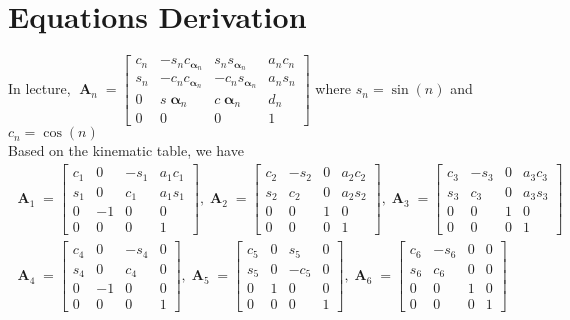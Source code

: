 \documentclass[12pt]{article}
\DeclareMathOperator{\A}{\mathbf{A}}
\DeclareMathOperator{\al}{\mathbf{\alpha}}
\begin{document}
\section{Equations Derivation}
  In lecture, $\A_n =
  \begin{bmatrix}
  c_n & -s_nc_{\al_n} &  s_ns_{\al_n} & a_nc_n\\
  s_n & -c_nc_{\al_n} & -c_ns_{\al_n} & a_ns_n\\
  0 & s\al_n & c\al_n & d_n\\
  0 & 0 & 0 & 1
  \end{bmatrix}$ where $s_n = \sin(n)$ and $c_n = \cos(n)$\\
  Based on the kinematic table, we have
  \begin{align*}
    \A_1 =
    \begin{bmatrix}
      c_1 & 0 & -s_1 & a_1c_1\\
      s_1 & 0 & c_1 & a_1s_1\\
      0 & -1 & 0 & 0\\
      0 & 0 & 0 & 1
    \end{bmatrix},
    \A_2 =
    \begin{bmatrix}
      c_2 & -s_2 & 0 & a_2c_2\\
      s_2 & c_2 & 0 & a_2s_2\\
      0 & 0 & 1 & 0\\
      0 & 0 & 0 & 1
    \end{bmatrix},
    \A_3 =
    \begin{bmatrix}
      c_3 & -s_3 & 0 & a_3c_3\\
      s_3 & c_3 & 0 & a_3s_3\\
      0 & 0 & 1 & 0\\
      0 & 0 & 0 & 1
    \end{bmatrix}
  \end{align*}
  \begin{align*}
    \A_4 =
    \begin{bmatrix}
      c_4 & 0 & -s_4 & 0\\
      s_4 & 0 & c_4 & 0\\
      0 & -1 & 0 & 0\\
      0 & 0 & 0 & 1
    \end{bmatrix},
    \A_5 =
    \begin{bmatrix}
      c_5 & 0 & s_5 & 0\\
      s_5 & 0 & -c_5 & 0\\
      0 & 1 & 0 & 0\\
      0 & 0 & 0 & 1
    \end{bmatrix},
    \A_6 =
    \begin{bmatrix}
      c_6 & -s_6 & 0 & 0\\
      s_6 & c_6 & 0 & 0\\
      0 & 0 & 1 & 0\\
      0 & 0 & 0 & 1
    \end{bmatrix}
  \end{align*}
\end{document}
